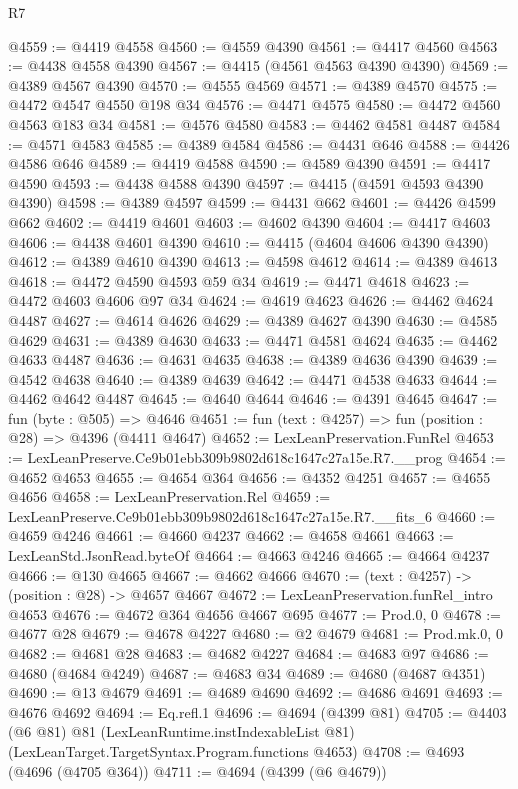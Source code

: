 \begin{lexlean}{R7}
\begin{coremodule}
@4559 := @4419 @4558
@4560 := @4559 @4390
@4561 := @4417 @4560
@4563 := @4438 @4558 @4390
@4567 := @4415 (@4561 @4563 @4390 @4390)
@4569 := @4389 @4567 @4390
@4570 := @4555 @4569
@4571 := @4389 @4570
@4575 := @4472 @4547 @4550 @198 @34
@4576 := @4471 @4575
@4580 := @4472 @4560 @4563 @183 @34
@4581 := @4576 @4580
@4583 := @4462 @4581 @4487
@4584 := @4571 @4583
@4585 := @4389 @4584
@4586 := @4431 @646
@4588 := @4426 @4586 @646
@4589 := @4419 @4588
@4590 := @4589 @4390
@4591 := @4417 @4590
@4593 := @4438 @4588 @4390
@4597 := @4415 (@4591 @4593 @4390 @4390)
@4598 := @4389 @4597
@4599 := @4431 @662
@4601 := @4426 @4599 @662
@4602 := @4419 @4601
@4603 := @4602 @4390
@4604 := @4417 @4603
@4606 := @4438 @4601 @4390
@4610 := @4415 (@4604 @4606 @4390 @4390)
@4612 := @4389 @4610 @4390
@4613 := @4598 @4612
@4614 := @4389 @4613
@4618 := @4472 @4590 @4593 @59 @34
@4619 := @4471 @4618
@4623 := @4472 @4603 @4606 @97 @34
@4624 := @4619 @4623
@4626 := @4462 @4624 @4487
@4627 := @4614 @4626
@4629 := @4389 @4627 @4390
@4630 := @4585 @4629
@4631 := @4389 @4630
@4633 := @4471 @4581 @4624
@4635 := @4462 @4633 @4487
@4636 := @4631 @4635
@4638 := @4389 @4636 @4390
@4639 := @4542 @4638
@4640 := @4389 @4639
@4642 := @4471 @4538 @4633
@4644 := @4462 @4642 @4487
@4645 := @4640 @4644
@4646 := @4391 @4645
@4647 := fun (byte : @505) => @4646
@4651 := fun (text : @4257) => fun (position : @28) => @4396 (@4411 @4647)
@4652 := LexLeanPreservation.FunRel
@4653 := LexLeanPreserve.Ce9b01ebb309b9802d618c1647c27a15e.R7.__prog
@4654 := @4652 @4653
@4655 := @4654 @364
@4656 := @4352 @4251
@4657 := @4655 @4656
@4658 := LexLeanPreservation.Rel
@4659 := LexLeanPreserve.Ce9b01ebb309b9802d618c1647c27a15e.R7.__fits_6
@4660 := @4659 @4246
@4661 := @4660 @4237
@4662 := @4658 @4661
@4663 := LexLeanStd.JsonRead.byteOf
@4664 := @4663 @4246
@4665 := @4664 @4237
@4666 := @130 @4665
@4667 := @4662 @4666
@4670 := (text : @4257) -> (position : @28) -> @4657 @4667
@4672 := LexLeanPreservation.funRel_intro @4653
@4676 := @4672 @364 @4656 @4667 @695
@4677 := Prod.{0, 0}
@4678 := @4677 @28
@4679 := @4678 @4227
@4680 := @2 @4679
@4681 := Prod.mk.{0, 0}
@4682 := @4681 @28
@4683 := @4682 @4227
@4684 := @4683 @97
@4686 := @4680 (@4684 @4249)
@4687 := @4683 @34
@4689 := @4680 (@4687 @4351)
@4690 := @13 @4679
@4691 := @4689 @4690
@4692 := @4686 @4691
@4693 := @4676 @4692
@4694 := Eq.refl.{1}
@4696 := @4694 (@4399 @81)
@4705 := @4403
    (@6 @81)
    @81
    (LexLeanRuntime.instIndexableList @81)
    (LexLeanTarget.TargetSyntax.Program.functions @4653)
@4708 := @4693 (@4696 (@4705 @364))
@4711 := @4694 (@4399 (@6 @4679))

\end{coremodule}
\end{lexlean}
